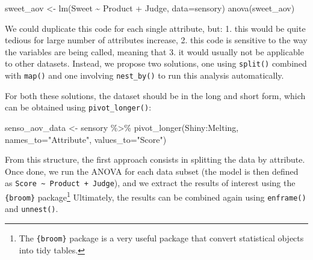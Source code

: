 \documentclass[
]{book}
\newenvironment{Shaded}{\begin{snugshade}}{\end{snugshade}}
\newcommand{\AttributeTok}[1]{\textcolor[rgb]{0.77,0.63,0.00}{#1}}
\newcommand{\FunctionTok}[1]{\textcolor[rgb]{0.00,0.00,0.00}{#1}}
\newcommand{\NormalTok}[1]{#1}
\newcommand{\OtherTok}[1]{\textcolor[rgb]{0.56,0.35,0.01}{#1}}
\newcommand{\SpecialCharTok}[1]{\textcolor[rgb]{0.00,0.00,0.00}{#1}}
\newcommand{\StringTok}[1]{\textcolor[rgb]{0.31,0.60,0.02}{#1}}
\begin{document}
\begin{Shaded}
\begin{Highlighting}[]
\NormalTok{sweet\_aov }\OtherTok{\textless{}{-}} \FunctionTok{lm}\NormalTok{(Sweet }\SpecialCharTok{\textasciitilde{}}\NormalTok{ Product }\SpecialCharTok{+}\NormalTok{ Judge, }\AttributeTok{data=}\NormalTok{sensory)}
\FunctionTok{anova}\NormalTok{(sweet\_aov)}
\end{Highlighting}
\end{Shaded}

We could duplicate this code for each single attribute, but: 1. this would be quite tedious for large number of attributes increase, 2. this code is sensitive to the way the variables are being called, meaning that 3. it would usually not be applicable to other datasets. Instead, we propose two solutions, one using \texttt{split()} combined with \texttt{map()} and one involving \texttt{nest\_by()} to run this analysis automatically.

For both these solutions, the dataset should be in the long and short form, which can be obtained using \texttt{pivot\_longer()}:

\begin{Shaded}
\begin{Highlighting}[]
\NormalTok{senso\_aov\_data }\OtherTok{\textless{}{-}}\NormalTok{ sensory }\SpecialCharTok{\%\textgreater{}\%} 
  \FunctionTok{pivot\_longer}\NormalTok{(Shiny}\SpecialCharTok{:}\NormalTok{Melting, }\AttributeTok{names\_to=}\StringTok{"Attribute"}\NormalTok{, }\AttributeTok{values\_to=}\StringTok{"Score"}\NormalTok{)}
\end{Highlighting}
\end{Shaded}

From this structure, the first approach consists in splitting the data by attribute. Once done, we run the ANOVA for each data subset (the model is then defined as \texttt{Score\ \textasciitilde{}\ Product\ +\ Judge}), and we extract the results of interest using the \texttt{\{broom\}} package\footnote{The \texttt{\{broom\}} package is a very useful package that convert statistical objects into tidy tables.}
Ultimately, the results can be combined again using \texttt{enframe()} and \texttt{unnest()}.
\end{document}

